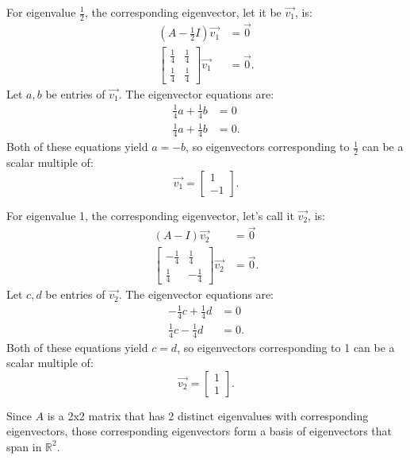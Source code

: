 \documentclass[10pt]{article}
\begin{document}
\noindent For eigenvalue $\frac{1}{2}$, the corresponding eigenvector, let it be $\Vec{v_1}$, is:
\begin{align*}
    \left(A- \frac{1}{2}I \right) \Vec{v_1} &= \Vec{0} \\
    \begin{bmatrix}
        \frac{1}{4} & \frac{1}{4} \\
        \frac{1}{4} & \frac{1}{4}
    \end{bmatrix} \Vec{v_1} &= \Vec{0}.
\end{align*}
\noindent Let $a, b$ be entries of $\Vec{v_1}$. The eigenvector equations are:
\begin{align*}
    \frac{1}{4}a + \frac{1}{4}b &= 0 \\
    \frac{1}{4}a + \frac{1}{4}b &= 0.
\end{align*}
\noindent Both of these equations yield $a=-b$, so eigenvectors corresponding to $\frac{1}{2}$ can be a scalar multiple of:
\begin{equation*}
    \Vec{v_1} = \begin{bmatrix} 1 \\ -1 \end{bmatrix}.
\end{equation*}

\noindent For eigenvalue 1, the corresponding eigenvector, let's call it $\Vec{v_2}$, is:
\begin{align*}
    \left(A- I \right) \Vec{v_2} &= \Vec{0} \\
    \begin{bmatrix}
        -\frac{1}{4} & \frac{1}{4} \\
        \frac{1}{4} & -\frac{1}{4}
    \end{bmatrix} \Vec{v_2} &= \Vec{0}.
\end{align*}
\noindent Let $c, d$ be entries of $\Vec{v_2}$. The eigenvector equations are:
\begin{align*}
    -\frac{1}{4}c + \frac{1}{4}d &= 0 \\
    \frac{1}{4}c - \frac{1}{4}d &= 0.
\end{align*}
\noindent Both of these equations yield $c=d$, so eigenvectors corresponding to 1 can be a scalar multiple of:
\begin{equation*}
    \Vec{v_2} = \begin{bmatrix} 1 \\ 1 \end{bmatrix}.
\end{equation*}

\noindent Since $A$ is a 2x2 matrix that has 2 distinct eigenvalues with corresponding eigenvectors, those corresponding eigenvectors form a basis of eigenvectors that span in $\mathbb{R}^2$.
\end{document}
